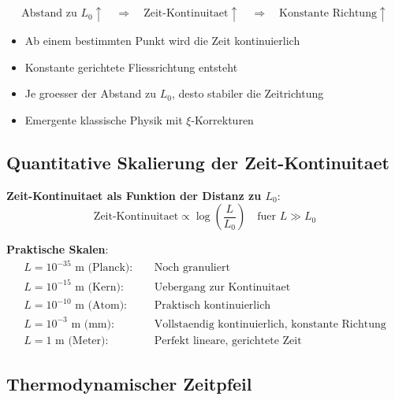 \documentclass[12pt,a4paper]{article}
\newcommand{\xipar}{\xi}
\newcommand{\Lzero}{L_0}
\theoremstyle{definition}
\theoremstyle{remark}
\begin{document}
	\begin{tcolorbox}[colback=blue!5!white,colframe=blue!75!black,title=Zentrale Erkenntnis]
		\begin{equation}
			\text{Abstand zu } \Lzero \uparrow \quad \Rightarrow \quad \text{Zeit-Kontinuitaet} \uparrow \quad \Rightarrow \quad \text{Konstante Richtung} \uparrow
		\end{equation}
	\end{tcolorbox}
	
	\begin{itemize}
		\item Ab einem bestimmten Punkt wird die Zeit kontinuierlich
		\item Konstante gerichtete Fliessrichtung entsteht
		\item Je groesser der Abstand zu $\Lzero$, desto stabiler die Zeitrichtung
		\item Emergente klassische Physik mit $\xipar$-Korrekturen
	\end{itemize}
	
	\subsection{Quantitative Skalierung der Zeit-Kontinuitaet}
	
	\textbf{Zeit-Kontinuitaet als Funktion der Distanz zu $\Lzero$}:
	\begin{equation}
		\text{Zeit-Kontinuitaet} \propto \log\left(\frac{L}{\Lzero}\right) \quad \text{fuer } L \gg \Lzero
	\end{equation}
	
	\textbf{Praktische Skalen}:
	\begin{align}
		L = 10^{-35}\text{ m (Planck)}: &\quad \text{Noch granuliert} \\
		L = 10^{-15}\text{ m (Kern)}: &\quad \text{Uebergang zur Kontinuitaet} \\
		L = 10^{-10}\text{ m (Atom)}: &\quad \text{Praktisch kontinuierlich} \\
		L = 10^{-3}\text{ m (mm)}: &\quad \text{Vollstaendig kontinuierlich, konstante Richtung} \\
		L = 1\text{ m (Meter)}: &\quad \text{Perfekt lineare, gerichtete Zeit}
	\end{align}
	
	\subsection{Thermodynamischer Zeitpfeil}
	
\end{document}
